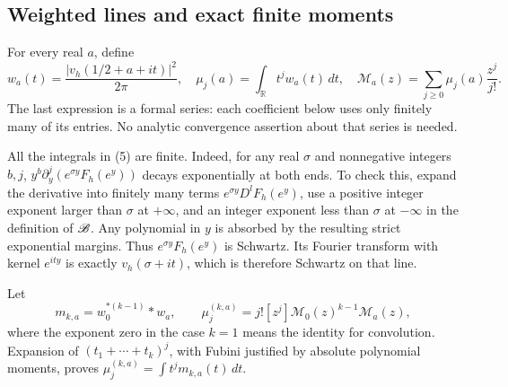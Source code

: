 \subsection{Weighted lines and exact finite moments}
For every real \(a\), define
\[
 w_a(t)=\frac{|v_h(1/2+a+it)|^2}{2\pi},\quad
 \mu_j(a)=\int_{\mathbb R}t^j w_a(t)\,dt,\quad
 \mathcal M_a(z)=\sum_{j\ge0}\mu_j(a)\frac{z^j}{j!}.
 \tag{5}
\]
The last expression is a formal series: each coefficient below uses
only finitely many of its entries. No analytic convergence assertion
about that series is needed.

All the integrals in (5) are finite. Indeed, for any real \(\sigma\)
and nonnegative integers \(b,j\),
\(y^b\partial_y^j(e^{\sigma y}F_h(e^y))\) decays exponentially at
both ends. To check this, expand the derivative into finitely many
terms \(e^{\sigma y}D^lF_h(e^y)\), use a positive integer exponent
larger than \(\sigma\) at \(+\infty\), and an integer exponent less
than \(\sigma\) at \(-\infty\) in the definition of \(\mathscr B\).
Any polynomial in \(y\) is absorbed by the resulting strict
exponential margins. Thus \(e^{\sigma y}F_h(e^y)\) is Schwartz.
Its Fourier transform with kernel \(e^{ity}\) is exactly
\(v_h(\sigma+it)\), which is therefore Schwartz on that line.

Let
\[
 m_{k,a}=w_0^{*(k-1)}*w_a,\qquad
 \mu^{(k,a)}_j=j![z^j]\mathcal M_0(z)^{k-1}\mathcal M_a(z),
 \tag{6}
\]
where the exponent zero in the case \(k=1\) means the identity for
convolution. Expansion of \((t_1+\cdots+t_k)^j\), with Fubini
justified by absolute polynomial moments, proves
\(\mu^{(k,a)}_j=\int t^jm_{k,a}(t)\,dt\).

